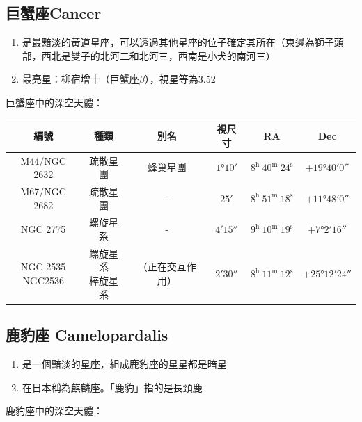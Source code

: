 \subsection{巨蟹座Cancer}
\begin{enumerate}
    \item 是最黯淡的黃道星座，可以透過其他星座的位子確定其所在（東邊為獅子頭部，西北是雙子的北河二和北河三，西南是小犬的南河三）
    \item 最亮星：柳宿增十（巨蟹座\(\beta\)），視星等為3.52
\end{enumerate}
巨蟹座中的深空天體：

\begin{center}
\begin{longtable}{c | c | c | c | c | c}
    編號 & 種類 & 別名 & 視尺寸 & RA & Dec \\
    \hline
    \endfirsthead


    \endfoot

    \endlastfoot

    M44/NGC 2632 & 疏散星團 & 蜂巢星團 & \(\ang{1;10;}\) & \(8^\text{h }40^\text{m }24^\text{s}\) & \(+\ang{19;40;0}\) \\
    M67/NGC 2682 & 疏散星團 & - & \(\ang{;25;}\) & \(8^\text{h }51^\text{m }18^\text{s}\) & \(+\ang{11;48;0}\) \\
    NGC 2775 & 螺旋星系 & - & \(\ang{;4;15}\) & \(9^\text{h }10^\text{m }19^\text{s}\) & \(+\ang{7;2;16}\) \\
    \makecell{NGC 2535\\NGC2536} & \makecell{螺旋星系\\棒旋星系} & （正在交互作用） & \(\ang{;2;30}\) & \(8^\text{h }11^\text{m }12^\text{s}\) & \(+\ang{25;12;24}\) \\
\end{longtable}
\end{center}

\subsection{鹿豹座 Camelopardalis}
\begin{enumerate}
    \item 是一個黯淡的星座，組成鹿豹座的星星都是暗星
    \item 在日本稱為麒麟座。「鹿豹」指的是長頸鹿
\end{enumerate}
鹿豹座中的深空天體：

